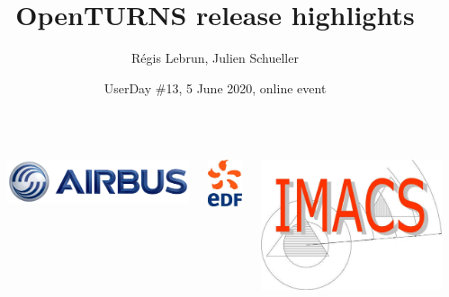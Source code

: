 \documentclass{beamer}
\title[OpenTURNS]{OpenTURNS release highlights}
\author[OpenTURNS et al.]{
Régis Lebrun, Julien Schueller
}
\date[]{UserDay \#13, 5 June 2020, online event}
\begin{document}

  \begin{frame}
  \titlepage

  \begin{columns}
  \begin{column}[t]{0.05\textwidth}
        \end{column}
  
  \begin{center}
\includegraphics[height=0.04\textheight]{figures/airbus-logo-3d-blue.png}
\end{center}

  \begin{center}
\includegraphics[height=0.09\textheight]{figures/logo-edf.jpg}
\end{center}

  \begin{center}
\includegraphics[height=0.09\textheight]{figures/imacs-logo.jpg}
\end{center}


\end{columns}
\end{frame}
\end{document}
